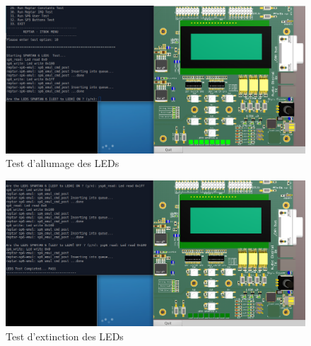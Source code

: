 \begin{figure}[H]
	\begin{center}
		\includegraphics[width=15cm]{img/leds1.png}
		\caption{Test d'allumage des LEDs}
		\label{leds1}
	\end{center}
\end{figure}
\begin{figure}[H]
	\begin{center}
		\includegraphics[width=15cm]{img/leds2.png}
		\caption{Test d'extinction des LEDs}
		\label{leds2}
	\end{center}
\end{figure}

